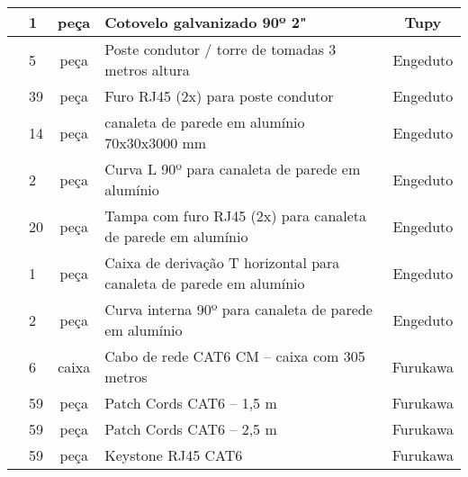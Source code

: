 \begin{table}[H]
{\begin{tabular}{|l|l|c|l|c|}
		& 1                   & peça                                  & Cotovelo galvanizado 90º 2"                                         & Tupy                                     \\ \hline
		& 5                   & peça                                  & Poste condutor / torre de tomadas 3 metros altura                   & Engeduto                                 \\ \hline
		& 39                  & peça                                  & Furo RJ45 (2x) para poste condutor                                  & Engeduto                                 \\ \hline
		& 14                  & peça                                  & canaleta de parede em alumínio 70x30x3000 mm                        & Engeduto                                 \\ \hline
		& 2                   & peça                                  & Curva L 90º para canaleta de parede em alumínio                     & Engeduto                                 \\ \hline
		& 20                  & peça                                  & Tampa com furo RJ45 (2x) para canaleta de parede em alumínio        & Engeduto                                 \\ \hline
		& 1                   & peça                                  & Caixa de derivação T horizontal para canaleta de parede em alumínio & Engeduto                                 \\ \hline
		& 2                   & peça                                  & Curva interna 90º para canaleta de parede em alumínio               & Engeduto                                 \\ \hline
		& 6                   & caixa                                 & Cabo de rede CAT6 CM – caixa com 305 metros                         & Furukawa                                 \\ \hline
		& 59                  & peça                                  & Patch Cords CAT6 – 1,5 m                                            & Furukawa                                 \\ \hline
		& 59                  & peça                                  & Patch Cords CAT6 – 2,5 m                                            & Furukawa                                 \\ \hline
		& 59                  & peça                                  & Keystone RJ45 CAT6                                                  & Furukawa                                 \\ \hline

\end{tabular}}
\end{table}
